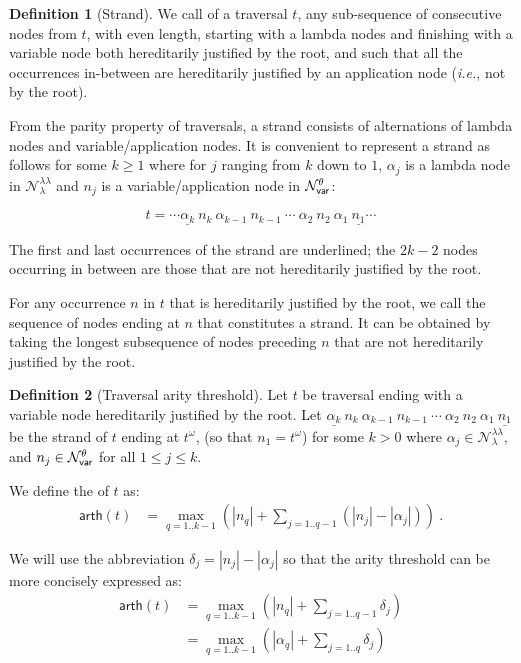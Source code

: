 \documentclass{article}
\makeatletter
\theoremstyle{plain}
\theoremstyle{definition}
\newtheorem{definition}{Definition}[section]
\theoremstyle{remark}
\newcommand\Nodes{\mathcal{N}}%
\newcommand\NodesVar{\Nodes_{\sf var}}%
\newcommand\NodesLmd{\Nodes_\lambda}%
\newcommand{\ghostlmd}{{\lambda\!\!\lambda}}
\newcommand{\ghostvar}{\theta}
\newcommand\ImNodesVar{\NodesVar^\ghostvar}
\newcommand\ImNodesLmd{\NodesLmd^\ghostlmd}
\newcommand\arth{\textsf{arth}} %
\renewcommand\ie{{\it i.e.\@\xspace}}
\makeatother
\begin{document}
\begin{definition}[Strand]
\label{ref:strand}
We call  of a traversal $t$, any sub-sequence of consecutive nodes from $t$,
with even length, starting with a lambda nodes and finishing with a variable node both hereditarily justified by the root, and such that all the occurrences in-between are hereditarily justified by an application node (\ie, not by the root).

From the parity property of traversals, a strand consists of alternations of lambda nodes and variable/application nodes. It is convenient to represent a strand as follows for some $k\geq 1$ where for $j$ ranging from $k$ down to $1$, $\alpha_j$ is a lambda node in $\ImNodesLmd$ and $n_j$ is a variable/application node in $\ImNodesVar$:

$$ t = \cdots \underline{\alpha_k}\ n_k\ \alpha_{k-1}\ n_{k-1}\ \cdots\ \alpha_2\ n_2\ \alpha_1\ \underline{n_1} \cdots $$

The first and last occurrences of the strand are underlined; the $2k-2$ nodes occurring in between are those that are not hereditarily justified by the root.

For any occurrence $n$ in $t$ that is hereditarily justified by the root, we call  the sequence of nodes ending at $n$ that constitutes a strand. It can be obtained by taking the longest subsequence of nodes preceding $n$ that are not hereditarily justified by the root.
\end{definition}

\begin{definition}[Traversal arity threshold]
\label{dfn:arity-threshold}
Let $t$ be traversal ending with a variable node hereditarily justified by the root.
Let $\underline{\alpha_k}\ n_k\ \alpha_{k-1}\ n_{k-1}\ \cdots\ \alpha_2\ n_2\ \alpha_1\ \underline{n_1}$ be the strand of $t$ ending at $t^\omega$, (so that $n_1 = t^\omega$) for some $k>0$  where $\alpha_j \in \ImNodesLmd$, and $n_j \in \ImNodesVar$ for all $1\leq j\leq k$.

We define the  of $t$ as:
\begin{align*}
\arth(t) &= \max_{q=1..k-1} \left( |n_q| + \sum_{j=1..q-1} (|n_j| - |\alpha_j|) \right)\ .
\end{align*}
\end{definition}

We will use the abbreviation $ \delta_j = |n_j| - |\alpha_j|$
so that the arity threshold can be more concisely expressed as:
\begin{align*}
    \arth(t) &= \max_{q=1..k-1} \left( |n_q| + \sum_{j=1..q-1} \delta_j \right) \\
    &= \max_{q=1..k-1} \left( |\alpha_q| + \sum_{j=1..q} \delta_j\right)
\end{align*}
\end{document}
